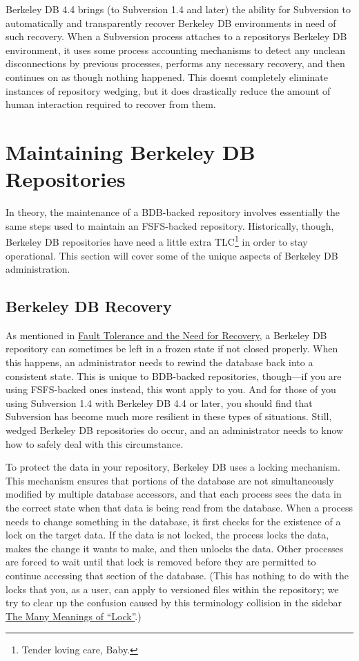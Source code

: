 Berkeley DB 4.4 brings (to Subversion 1.4 and later) the ability for
Subversion to automatically and transparently recover Berkeley DB
environments in need of such recovery. When a Subversion process
attaches to a repository\textquotesingle s Berkeley DB environment, it
uses some process accounting mechanisms to detect any unclean
disconnections by previous processes, performs any necessary recovery,
and then continues on as though nothing happened. This
doesn\textquotesingle t completely eliminate instances of repository
wedging, but it does drastically reduce the amount of human interaction
required to recover from them.

\section{Maintaining Berkeley DB
Repositories}\label{svn.berkeleydb.maintenance}

In theory, the maintenance of a BDB-backed repository involves
essentially the same steps used to maintain an FSFS-backed repository.
Historically, though, Berkeley DB repositories have need a little extra
TLC\footnote{Tender loving care, Baby.} in order to stay operational.
This section will cover some of the unique aspects of Berkeley DB
administration.

\subsection{Berkeley DB
Recovery}\label{svn.berkeleydb.maintenance.recovery}

As mentioned in
\hyperref[svn.berkeleydb.limitations.faulttolerance]{Fault Tolerance and
the Need for Recovery}, a Berkeley DB repository can sometimes be left
in a frozen state if not closed properly. When this happens, an
administrator needs to rewind the database back into a consistent state.
This is unique to BDB-backed repositories, though---if you are using
FSFS-backed ones instead, this won\textquotesingle t apply to you. And
for those of you using Subversion 1.4 with Berkeley DB 4.4 or later, you
should find that Subversion has become much more resilient in these
types of situations. Still, wedged Berkeley DB repositories do occur,
and an administrator needs to know how to safely deal with this
circumstance.

To protect the data in your repository, Berkeley DB uses a locking
mechanism. This mechanism ensures that portions of the database are not
simultaneously modified by multiple database accessors, and that each
process sees the data in the correct state when that data is being read
from the database. When a process needs to change something in the
database, it first checks for the existence of a lock on the target
data. If the data is not locked, the process locks the data, makes the
change it wants to make, and then unlocks the data. Other processes are
forced to wait until that lock is removed before they are permitted to
continue accessing that section of the database. (This has nothing to do
with the locks that you, as a user, can apply to versioned files within
the repository; we try to clear up the confusion caused by this
terminology collision in the sidebar
\hyperref[svn.advanced.locking.meanings]{The Many Meanings of
``Lock''}.)

